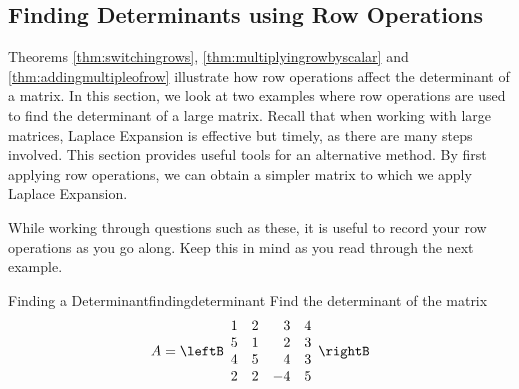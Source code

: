 \subsection{Finding Determinants using Row Operations}

Theorems \ref{thm:switchingrows}, \ref{thm:multiplyingrowbyscalar} and \ref{thm:addingmultipleofrow} illustrate 
how row operations affect the determinant of a matrix. In this section, we look at two examples where row operations are 
used to find the determinant of a large matrix. Recall that when working with large matrices, Laplace Expansion
is effective but timely, as there are many steps involved. This section provides useful tools for
an alternative method. By first applying row operations, we can obtain a simpler matrix to which we apply Laplace Expansion. 

While working through questions such as these, it is useful to record your row operations as you go along. Keep this in mind
as you read through the next example. 

\begin{example}{Finding a Determinant}{findingdeterminant}
Find the determinant of the matrix
\begin{equation*}
A=\leftB
\begin{array}{rrrr}
1 & 2 & 3 & 4 \\
5 & 1 & 2 & 3 \\
4 & 5 & 4 & 3 \\
2 & 2 & -4 & 5
\end{array}
\rightB
\end{equation*}
\end{example}

